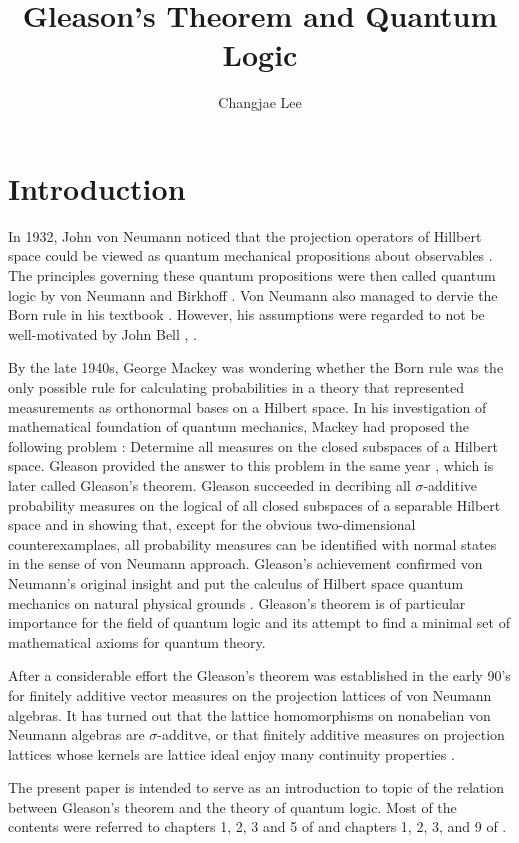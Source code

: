 \documentclass[a4paper,11pt]{report}
\title{Gleason's Theorem and Quantum Logic}
\author{Changjae Lee}
\theoremstyle{definition}
\theoremstyle{plain}
\theoremstyle{remark}
\begin{document}
\maketitle

\tableofcontents

\chapter*{Introduction}

In 1932, John von Neumann noticed that the projection operators of Hillbert space could be viewed as quantum mechanical propositions about observables \cite{Neumann2018}. The principles governing these quantum propositions were then called quantum logic by von Neumann and Birkhoff \cite{MR1503312}. Von Neumann also managed to dervie the Born rule in his textbook \cite{Neumann2018}. However, his assumptions were regarded to not be well-motivated by John Bell \cite{MR208927}, \cite{MR2726358}.

By the late 1940s, George Mackey was wondering whether the Born rule was the only possible rule for calculating probabilities in a theory that represented measurements as orthonormal bases on a Hilbert space. In his investigation of mathematical foundation of quantum mechanics, Mackey had proposed the following problem \cite[p.50-51]{MR96112}\cite[p.129]{MR1256736}: Determine all measures on the closed subspaces of a Hilbert space. Gleason provided the answer to this problem in the same year \cite{MR96113}, which is later called Gleason's theorem. Gleason succeeded in decribing all \(\sigma\)-additive probability measures on the logical of all closed subspaces of a separable Hilbert space and in showing that, except for the obvious two-dimensional counterexamplaes, all probability measures can be identified with normal states in the sense of von Neumann approach. Gleason's achievement confirmed von Neumann's original insight and put the calculus of Hilbert space quantum mechanics on natural physical grounds \cite[p.87-88]{MR2015280}. Gleason's theorem is of particular importance for the field of quantum logic and its attempt to find a minimal set of mathematical axioms for quantum theory.

After a considerable effort the Gleason's theorem was established in the early 90's for finitely additive vector measures on the projection lattices of von Neumann algebras. It has turned out that the lattice homomorphisms on nonabelian von Neumann algebras are \(\sigma\)-additve, or that finitely additive measures on projection lattices whose kernels are lattice ideal enjoy many continuity properties \cite[p.3-4]{MR2015280}.

The present paper is intended to serve as an introduction to topic of the relation between Gleason's theorem and the theory of quantum logic. Most of the contents were referred to chapters 1, 2, 3 and 5 of \cite{MR1256736} and chapters 1, 2, 3, and 9 of \cite{MR2015280}.








\end{document}
